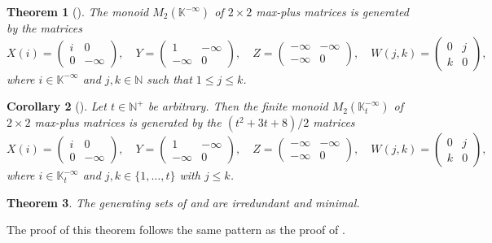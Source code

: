 \documentclass[11pt]{article}
\newtheorem{thm}{Theorem}[subsection]
\newtheorem{cor}[thm]{Corollary}
\numberwithin{equation}{section}
\newcommand{\N}{\mathbb{N}}
\newcommand{\Np}{\N^{+}}
\newcommand{\K}{\mathbb{K}}
\newcommand{\Kmax}{\K^{-\infty}}
\newcommand{\Kmaxt}{\K^{-\infty}_t}
\newcommand{\mat}[4]{\begin{pmatrix}#1&#2\\#3&#4\end{pmatrix}}
\newcommand{\COMMA}{,\quad}
\begin{document}
\begin{thm}[\cite{East2020aa}]
  The monoid $M_2(\Kmax)$ of $2 \times 2$ max-plus matrices is
  generated by the matrices 
  \[
    X(i) = \mat i00{-\infty} \COMMA
    Y = \mat 1{-\infty}{-\infty}0 \COMMA
    Z = \mat {-\infty}{-\infty}{-\infty}0 \COMMA
    W(j,k) = \mat 0jk0 ,
  \]
  where $i\in \Kmax$ and $j, k\in\N$ such that $1 \leq j \leq k$.
\end{thm}

\begin{cor}[\cite{East2020aa}]
  Let $t\in \Np$ be arbitrary. Then the finite monoid $M_2(\Kmaxt)$ of $2
  \times 2$ max-plus matrices is generated by the $(t^2+3t+8)/2$ matrices 
  \[
    X(i) = \mat i00{-\infty} \COMMA
  Y = \mat 1{-\infty}{-\infty}0 \COMMA
  Z = \mat {-\infty}{-\infty}{-\infty}0 \COMMA
  W(j,k) = \mat 0jk0 ,
  \]
  where $i\in\Kmaxt$ and $j,k\in\{1,\ldots,t\}$ with $j\leq k$.
\end{cor}

\begin{thm}
  The generating sets of  and
   are irredundant and minimal.
\end{thm}
The proof of this theorem follows the same pattern as the proof of
.
\end{document}
